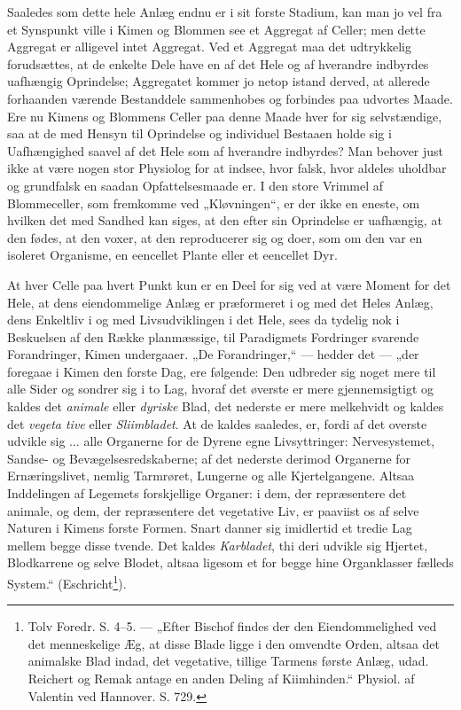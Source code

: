 \documentclass[11pt]{book}
\newcommand{\opage}[1]{\marginnote{\footnotesize\textit{[#1]}}}
\begin{document}
Saaledes som dette hele Anlæg endnu er i sit forste Stadium, kan
man jo vel fra et Synspunkt ville i Kimen og Blommen see et Aggregat
af Celler; men dette Aggregat er alligevel intet Aggregat. Ved et
Aggregat maa det udtrykkelig forudsættes, at de enkelte Dele have en af
det Hele og af hverandre indbyrdes uafhængig Oprindelse; Aggregatet
kommer jo netop istand derved, at allerede forhaanden værende
Bestanddele sammenhobes og forbindes paa udvortes Maade. Ere nu
Kimens og Blommens Celler paa denne Maade hver for sig selvstændige,
saa at de med Hensyn til Oprindelse og individuel Bestaaen holde sig i
Uafhængighed saavel af det Hele som af hverandre indbyrdes? Man
behover just ikke at være nogen stor Physiolog for at indsee, hvor falsk,
hvor aldeles uholdbar og grundfalsk en saadan Opfattelsesmaade er. I
den store Vrimmel af Blommeceller, som fremkomme ved „Kløvningen“,
er der ikke en eneste, om hvilken det med Sandhed kan siges, at den
efter sin Oprindelse er uafhængig, at den fødes, at den voxer, at den
reproducerer sig og doer, som om den var en isoleret Organisme, en
eencellet Plante eller et eencellet Dyr.

At hver Celle paa hvert Punkt kun er en Deel for sig ved at være
Moment for det Hele, at dens eiendommelige Anlæg er præformeret i og
med det Heles Anlæg, dens Enkeltliv i og med Livsudviklingen i det
Hele, sees da tydelig nok i Beskuelsen af den Række planmæssige, til
Paradigmets Fordringer svarende Forandringer, Kimen undergaaer. „De
Forandringer,“ --- hedder det --- „der foregaae i Kimen den forste
Dag, ere følgende: Den udbreder sig noget mere til alle Sider og sondrer
sig i to Lag, hvoraf det øverste er
\opage{346} \setcounter{footnote}{0}%
mere gjennemsigtigt og kaldes det \emph{animale} eller \emph{dyriske}
Blad, det nederste er mere melkehvidt og kaldes det \emph{vegeta\-%
tive} eller \emph{Sliimbladet}. At de kaldes saaledes, er, fordi af det
overste udvikle sig ... alle Organerne for de Dyrene egne Livsyttringer:
Nervesystemet, Sandse- og Bevægelsesredskaberne; af det nederste derimod
Organerne for Ernæringslivet, nemlig Tarmrøret, Lungerne og alle
Kjertelgangene. Altsaa Inddelingen af Legemets forskjellige Organer: i
dem, der repræsentere det animale, og dem, der repræsentere det
vegetative Liv, er paaviist os af selve Naturen i Kimens forste Formen.
Snart danner sig imidlertid et tredie Lag mellem begge disse tvende.
Det kaldes \emph{Karbladet}, thi deri udvikle sig Hjertet, Blodkarrene og
selve Blodet, altsaa ligesom et for begge hine Organklasser fælleds
System.“ (Eschricht\footnote{Tolv Foredr. S. 4--5. --- „Efter Bischof findes
der den Eiendommelighed ved det menneskelige Æg, at disse Blade ligge i den
omvendte Orden, altsaa det animalske Blad indad, det vegetative, tillige
Tarmens første Anlæg, udad. Reichert og Remak antage en anden Deling af
Kiimhinden.“ Physiol. af Valentin ved Hannover. S. 729.}).
\end{document}
